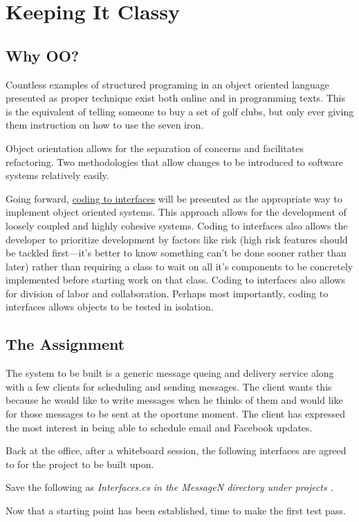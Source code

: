 
\chapter{Keeping It Classy}

\section{Why OO?}
Countless examples of structured programing in an object oriented language presented as proper technique exist both online and in programming texts. This is the equivalent of telling someone to buy a set of golf clubs, but only ever giving them instruction on how to use the seven iron.

Object orientation allows for the separation of concerns and facilitates refactoring. Two methodologies that allow changes to be introduced to software systems relatively easily.

Going forward, \href{http://www.javaworld.com/javaworld/jw-08-1999/jw-08-interfaces.html}{coding to interfaces} will be presented as the appropriate way to implement object oriented systems. This approach allows for the development of loosely coupled and highly cohesive systems. Coding to interfaces also allows the developer to prioritize development by factors like risk (high risk features should be tackled first---it's better to know something can't be done sooner rather than later) rather than requiring a class to wait on all it's components to be concretely implemented before starting work on that class. Coding to interfaces also allows for division of labor and collaboration. Perhaps most importantly, coding to interfaces allows objects to be tested in isolation.

\section{The Assignment}
The system to be built is a generic message queing and delivery service along with a few clients for scheduling and sending messages. The client wants this because he would like to write messages when he thinks of them and would like for those messages to be sent at the oportune moment. The client has expressed the most interest in being able to schedule email and Facebook updates.

Back at the office, after a whiteboard session, the following interfaces are agreed to for the project to be built upon.

Save the following as \em Interfaces.cs \em in the \em MessageN \em directory under \em projects \em.



Now that a starting point has been established, time to make the first test pass.